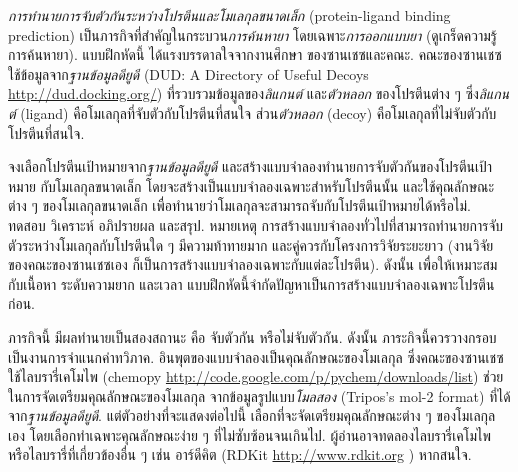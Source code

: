 \begin{Exercise}
	\label{ex: binding affinity}
	
	\textit{การทำนายการจับตัวกันระหว่างโปรตีนและโมเลกุลขนาดเล็ก} (protein-ligand binding prediction)
เป็นภารกิจที่สำคัญในกระบวน\textit{การค้นหายา} โดยเฉพาะ\textit{การออกแบบยา} (ดูเกร็ดความรู้การค้นหายา).
	แบบฝึกหัดนี้ ได้แรงบรรดาลใจจากงานศึกษา%
	ของซานเชซและคณะ\cite{SanchezEtAl2014a}.
	คณะของซานเชซ ใช้ข้อมูลจาก\textit{ฐานข้อมูลดียูดี} (DUD: A Directory of Useful Decoys \url{http://dud.docking.org/})
	ที่รวบรวมข้อมูลของ\textit{ลิแกนต์} และ\textit{ตัวหลอก} 
	ของโปรตีนต่าง ๆ 
	ซึ่ง\textit{ลิแกนต์} (ligand) 
	คือโมเลกุลที่จับตัวกับโปรตีนที่สนใจ
	ส่วน\textit{ตัวหลอก} (decoy)
	คือโมเลกุลที่ไม่จับตัวกับโปรตีนที่สนใจ.
		
	จงเลือกโปรตีนเป้าหมายจาก\textit{ฐานข้อมูลดียูดี}
	และสร้างแบบจำลองทำนายการจับตัวกันของโปรตีนเป้าหมาย กับโมเลกุลขนาดเล็ก
	โดยจะสร้างเป็นแบบจำลองเฉพาะสำหรับโปรตีนนั้น
	และใช้คุณลักษณะต่าง ๆ ของโมเลกุลขนาดเล็ก เพื่อทำนายว่าโมเลกุลจะสามารถจับกับโปรตีนเป้าหมายได้หรือไม่.
ทดสอบ วิเคราะห์ อภิปรายผล และสรุป.
	หมายเหตุ การสร้างแบบจำลองทั่วไปที่สามารถทำนายการจับตัวระหว่างโมเลกุลกับโปรตีนใด ๆ มีความท้าทายมาก และคู่ควรกับโครงการวิจัยระยะยาว (งานวิจัยของคณะของซานเชซ\cite{SanchezEtAl2014a}เอง ก็เป็นการสร้างแบบจำลองเฉพาะกับแต่ละโปรตีน). ดังนั้น เพื่อให้เหมาะสมกับเนื้อหา ระดับความยาก และเวลา %
	แบบฝึกหัดนี้จำกัดปัญหาเป็นการสร้างแบบจำลองเฉพาะโปรตีนก่อน.
		
	ภารกิจนี้ มีผลทำนายเป็นสองสถานะ คือ จับตัวกัน หรือไม่จับตัวกัน.
	ดังนั้น ภาระกิจนี้ควรวางกรอบเป็นงานการจำแนกค่าทวิภาค.
	อินพุตของแบบจำลองเป็นคุณลักษณะของโมเลกุล 
	ซึ่งคณะของซานเชซ\cite{SanchezEtAl2014a} 
	ใช้ไลบรารี่เคโมไพ (chemopy\cite{CaoEtAl2013a} \url{http://code.google.com/p/pychem/downloads/list})
	ช่วยในการจัดเตรียมคุณลักษณะของโมเลกุล จากข้อมูลรูปแบบ\textit{โมลสอง} (Tripos's mol-2 format)
	ที่ได้จาก\textit{ฐานข้อมูลดียูดี}.
	แต่ตัวอย่างที่จะแสดงต่อไปนี้ เลือกที่จะจัดเตรียมคุณลักษณะต่าง ๆ ของโมเลกุลเอง
	โดยเลือกทำเฉพาะคุณลักษณะง่าย ๆ ที่ไม่ซับซ้อนจนเกินไป.
	ผู้อ่านอาจทดลองไลบรารี่เคโมไพ หรือไลบรารี่ที่เกี่ยวข้องอื่น ๆ เช่น อาร์ดีคิต (RDKit \url{http://www.rdkit.org} ) หากสนใจ.


\end{Exercise}

